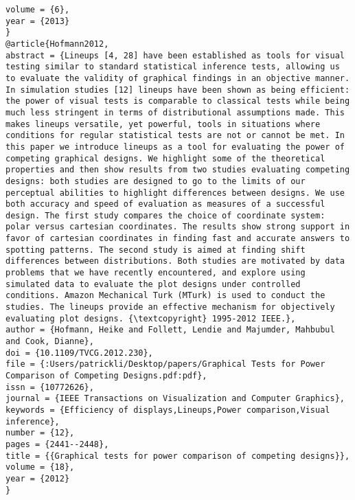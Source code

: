 \documentclass[
]{book}
\begin{document}
\begin{verbatim}
volume = {6},
year = {2013}
}
@article{Hofmann2012,
abstract = {Lineups [4, 28] have been established as tools for visual testing similar to standard statistical inference tests, allowing us to evaluate the validity of graphical findings in an objective manner. In simulation studies [12] lineups have been shown as being efficient: the power of visual tests is comparable to classical tests while being much less stringent in terms of distributional assumptions made. This makes lineups versatile, yet powerful, tools in situations where conditions for regular statistical tests are not or cannot be met. In this paper we introduce lineups as a tool for evaluating the power of competing graphical designs. We highlight some of the theoretical properties and then show results from two studies evaluating competing designs: both studies are designed to go to the limits of our perceptual abilities to highlight differences between designs. We use both accuracy and speed of evaluation as measures of a successful design. The first study compares the choice of coordinate system: polar versus cartesian coordinates. The results show strong support in favor of cartesian coordinates in finding fast and accurate answers to spotting patterns. The second study is aimed at finding shift differences between distributions. Both studies are motivated by data problems that we have recently encountered, and explore using simulated data to evaluate the plot designs under controlled conditions. Amazon Mechanical Turk (MTurk) is used to conduct the studies. The lineups provide an effective mechanism for objectively evaluating plot designs. {\textcopyright} 1995-2012 IEEE.},
author = {Hofmann, Heike and Follett, Lendie and Majumder, Mahbubul and Cook, Dianne},
doi = {10.1109/TVCG.2012.230},
file = {:Users/patrickli/Desktop/papers/Graphical Tests for Power Comparison of Competing Designs.pdf:pdf},
issn = {10772626},
journal = {IEEE Transactions on Visualization and Computer Graphics},
keywords = {Efficiency of displays,Lineups,Power comparison,Visual inference},
number = {12},
pages = {2441--2448},
title = {{Graphical tests for power comparison of competing designs}},
volume = {18},
year = {2012}
}


\end{verbatim}
\end{document}
